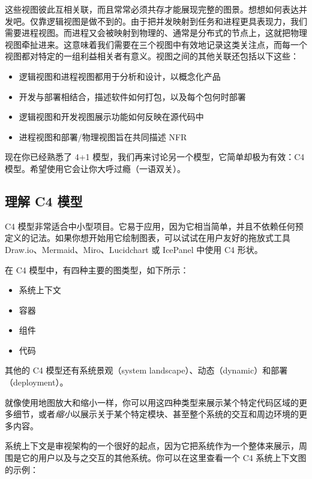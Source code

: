 
\label{idx:202}
\label{idx:203}
这些视图彼此互相关联，而且常常必须共存才能展现完整的图景。想想如何表达并发吧。仅靠逻辑视图是做不到的。由于把并发映射到任务和进程更具表现力，我们需要进程视图。而进程又会被映射到物理的、通常是分布式的节点上，这就把物理视图牵扯进来。这意味着我们需要在三个视图中有效地记录这类关注点，而每一个视图都对特定的一组利益相关者有意义。视图之间的其他关联还包括以下这些：

\begin{itemize}
\item 逻辑视图和进程视图都用于分析和设计，以概念化产品
\item 开发与部署相结合，描述软件如何打包，以及每个包何时部署
\item 逻辑视图和开发视图展示功能如何反映在源代码中
\item 进程视图和部署/物理视图旨在共同描述 NFR
\end{itemize}

现在你已经熟悉了 4+1 模型，我们再来讨论另一个模型，它简单却极为有效：C4 模型。希望使用它会让你大呼过瘾（一语双关）。

\subsection{理解 C4 模型}

\label{idx:204}
\label{idx:205}
C4 模型非常适合中小型项目。它易于应用，因为它相当简单，并且不依赖任何预定义的记法。如果你想开始用它绘制图表，可以试试在用户友好的拖放式工具 Draw.io、Mermaid、Miro、Lucidchart 或 IcePanel 中使用 C4 形状。

在 C4 模型中，有四种主要的图类型，如下所示：

\begin{itemize}
\item 系统上下文
\item 容器
\item 组件
\item 代码
\end{itemize}

其他的 C4 模型还有系统景观（system landscape）、动态（dynamic）和部署（deployment）。

就像使用地图放大和缩小一样，你可以用这四种类型来展示某个特定代码区域的更多细节，或者\emph{缩小}以展示关于某个特定模块、甚至整个系统的交互和周边环境的更多内容。

系统上下文是审视架构的一个很好的起点，因为它把系统作为一个整体来展示，周围是它的用户以及与之交互的其他系统。你可以在这里查看一个 C4 系统上下文图的示例：

